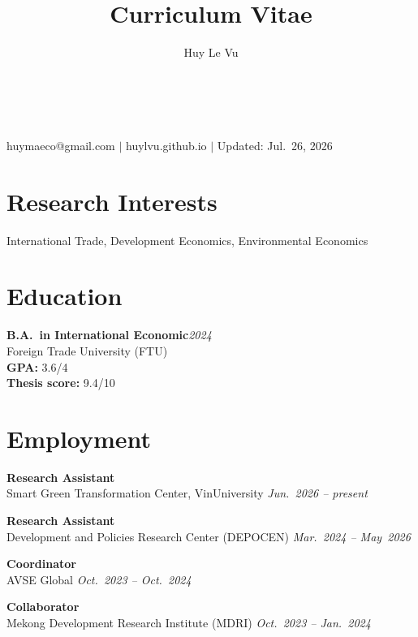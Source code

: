 \documentclass[10.5pt]{article}
\makeatletter
\newcommand{\cvcolor}{\color{DodgerBlue4}} %
\renewcommand{\maketitle}{
\begin{center}
{\Huge\theauthor}\\
\vspace{0.5em}
{\Large \cvcolor{Curriculum Vitae}}\\
{\color{Gray}huymaeco@gmail.com $|$ huylvu.github.io $|$ Updated: Jul.\ 26, 2026}
\end{center}
}
\makeatother
\begin{document}
\title{Curriculum Vitae} %
\author{Huy Le Vu}

\maketitle


\section{Research Interests}
International Trade, Development Economics, Environmental Economics


\section{Education}

\textbf{B.A.\ in International Economic}\hfill\emph{2024}\\
Foreign Trade University (FTU) \\
\textbf{GPA:} 3.6/4\\
\textbf{Thesis score:} 9.4/10


\section{Employment}

\textbf{Research Assistant} \hfill \\
Smart Green Transformation Center, VinUniversity \hfill \emph{Jun.\ 2026 -- present}

\textbf{Research Assistant} \hfill \\
Development and Policies Research Center (DEPOCEN) \hfill \emph{Mar.\ 2024 -- May\ 2026}

\textbf{Coordinator} \hfill \\
AVSE Global \hfill \emph{Oct.\ 2023 -- Oct.\ 2024}

\textbf{Collaborator} \hfill \\
Mekong Development Research Institute (MDRI) \hfill \emph{Oct.\ 2023 -- Jan.\ 2024}
\end{document}
